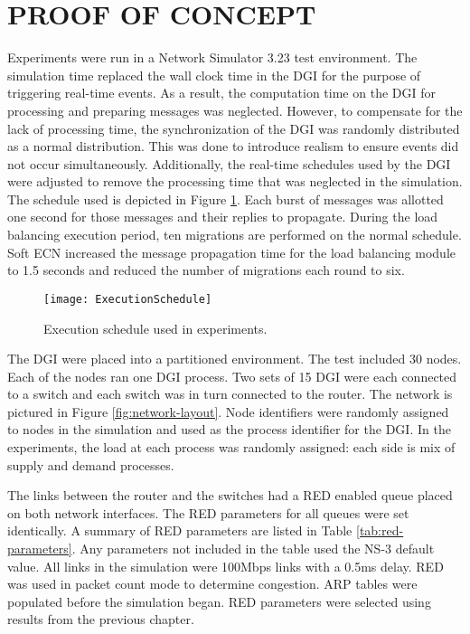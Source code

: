 \section{PROOF OF CONCEPT}
\label{sect:experimentalsetup}
Experiments were run in a Network Simulator 3.23\cite{NS3} test environment.
The simulation time replaced the wall clock time in the \ac{DGI} for the purpose of triggering real-time events.
As a result, the computation time on the \ac{DGI} for processing and preparing messages was neglected.
However, to compensate for the lack of processing time, the synchronization of the \ac{DGI} was randomly distributed as a normal distribution.
This was done to introduce realism to ensure events did not occur simultaneously.
Additionally, the real-time schedules used by the \ac{DGI} were adjusted to remove the processing time that was neglected in the simulation.
The schedule used is depicted in Figure \ref{fig:execution-schedule}.
Each burst of messages was allotted one second for those messages and their replies to propagate. During the load balancing execution period, ten migrations are performed on the normal schedule. Soft ECN increased the message propagation time for the load balancing module to 1.5 seconds and reduced the number of migrations each round to six.

\begin{figure}
\centering
\texttt{[image: ExecutionSchedule]}
\caption{Execution schedule used in experiments. }
\label{fig:execution-schedule}
\end{figure}

The \ac{DGI} were placed into a partitioned environment.
The test included 30 nodes.
Each of the nodes ran one \ac{DGI} process.
Two sets of 15 \ac{DGI} were each connected to a switch and each switch was in turn connected to the router.
The network is pictured in Figure \ref{fig:network-layout}.
Node identifiers were randomly assigned to nodes in the simulation and used as the process identifier for the \ac{DGI}.
In the experiments, the load at each process was randomly assigned: each side is mix of supply and demand processes.

The links between the router and the switches had a \ac{RED} enabled queue placed on both network interfaces.
The \ac{RED} parameters for all queues were set identically.
A summary of \ac{RED} parameters are listed in Table \ref{tab:red-parameters}.
Any parameters not included in the table used the NS-3 default value.
All links in the simulation were 100Mbps links with a 0.5ms delay.
RED was used in packet count mode to determine congestion.
ARP tables were populated before the simulation began.
\ac{RED} parameters were selected using results from the previous chapter.

